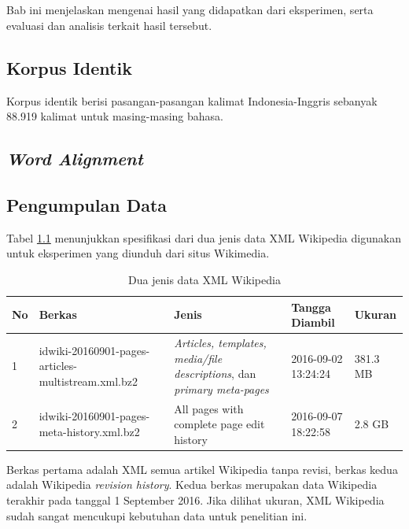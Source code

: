 \chapter{\babLima}
Bab ini menjelaskan mengenai hasil yang didapatkan dari eksperimen, serta evaluasi dan analisis terkait hasil tersebut.

\section{Korpus Identik}
Korpus identik berisi pasangan-pasangan kalimat Indonesia-Inggris sebanyak 88.919 kalimat untuk masing-masing bahasa.

\section{\textit{Word Alignment}}


\section{Pengumpulan Data}
Tabel \ref{table:dataXML} menunjukkan spesifikasi dari dua jenis data XML Wikipedia digunakan untuk eksperimen yang diunduh dari situs Wikimedia.

\begin{table}
	\centering
	\caption{Dua jenis data XML Wikipedia}
	\label{table:dataXML}
		\begin{tabular}{|p{0.7cm}|p{4cm}|p{4cm}|p{2cm}|p{1.5cm}|}
			\hline
			No & Berkas & Jenis & Tangga Diambil & Ukuran \\ 
			\hline
			1    & 
			idwiki-20160901-pages-articles-multistream.xml.bz2   & \textit{Articles, templates, media/file descriptions}, dan \textit{primary meta-pages}  & 2016-09-02 13:24:24  & 
			381.3 MB  \\ \hline
			2    & 
			idwiki-20160901-pages-meta-history.xml.bz2     & 
			All pages with complete page edit history  & 
			2016-09-07 18:22:58  & 
			2.8 GB    \\ \hline
		\end{tabular}
\end{table}
\noindent Berkas pertama adalah XML semua artikel Wikipedia tanpa revisi, berkas kedua adalah Wikipedia \textit{revision history}. Kedua berkas merupakan data Wikipedia terakhir pada tanggal 1 September 2016. Jika dilihat ukuran, XML Wikipedia sudah sangat mencukupi kebutuhan data untuk penelitian ini.

